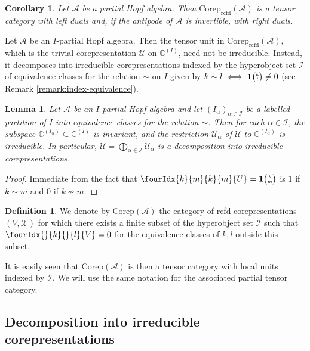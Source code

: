 \documentclass[11pt]{article}
\DeclareMathOperator{\rcf}{\mathrm{rcfd}}
\newcommand{\Corep}{\mathrm{Corep}}
\newcommand{\C}{\mathbb{C}}
\newcommand{\Grt}[3]{#1{\tiny {\begin{pmatrix} #2\\#3\end{pmatrix}}}}
\newcommand{\UnitC}[2]{\Grt{\mathbf{1}}{#1}{#2}}
\newcommand{\Gr}[5]{\fourIdx{#2}{#4}{#3}{#5}{#1}}%
\newcommand{\Gru}[3]{\Gr{#1}{}{}{#2}{#3}}
\newtheorem{Lem}[Theorem]{Lemma}
\newtheorem{Cor}[Theorem]{Corollary}
\theoremstyle{definition}
\newtheorem{Def}[Theorem]{Definition}
\numberwithin{equation}{section}
\begin{document}
\begin{Cor} \label{cor:rep-tensor-duality}
  Let $\mathscr{A}$ be a partial Hopf algebra. Then
  $\Corep_{\rcf}(\mathscr{A})$ is a tensor category with left
  duals and, if the antipode of $\mathscr{A}$ is invertible, with right duals.
\end{Cor}

Let $\mathscr{A}$ be an $I$-partial Hopf algebra.  Then the tensor
unit in $\Corep_{\rcf}(\mathscr{A})$, which is the trivial corepresentation
$\mathscr{U}$ on $\C^{(I)}$, need not be irreducible. Instead, it decomposes
into irreducible corepresentations indexed by the hyperobject set $\mathscr{I}$ of equivalence
classes for the relation $\sim$ on $I$ given by  $k \sim l \iff
  \UnitC{k}{l}\neq 0$ (see Remark
\ref{remark:index-equivalence}).
\begin{Lem}
  Let $\mathscr{A}$ be an $I$-partial Hopf algebra and let
  $(I_{\alpha})_{\alpha\in \mathscr{I}}$ be a labelled partition of $I$ into
  equivalence classes for the relation $\sim$.  Then for each $\alpha\in \mathscr{I}$, the subspace
  $\C^{(I_{\alpha})} \subseteq \C^{(I)}$ is invariant, and the restriction
  $\mathscr{U_{\alpha}}$ of $\mathscr{U}$ to $\C^{(I_{\alpha})}$ is
  irreducible. In particular, $\mathscr{U}=\bigoplus_{\alpha\in\mathscr{I}}
  \mathscr{U_{\alpha}}$ is a decomposition into irreducible corepresentations.
\end{Lem}
\begin{proof}
Immediate from the fact that $\Gr{U}{k}{k}{m}{m} = 
  \UnitC{k}{m}$  is $1$  if $k\sim m$  and $0$ if $k\not\sim m$. 
\end{proof}

\begin{Def} We denote by $\Corep(\mathscr{A})$ the category of rcfd corepresentations $(V,\mathscr{X})$ for which there exists a finite subset of the hyperobject set $\mathscr{I}$ such that $\Gru{V}{k}{l}=0$ for the equivalence classes of $k,l$ outside this subset.
\end{Def}

It is easily seen that $\Corep(\mathscr{A})$ is then a tensor category with local units indexed by $\mathscr{I}$. We will use the same notation for the associated partial tensor category. 


\subsection{Decomposition into irreducible corepresentations}
\end{document}
